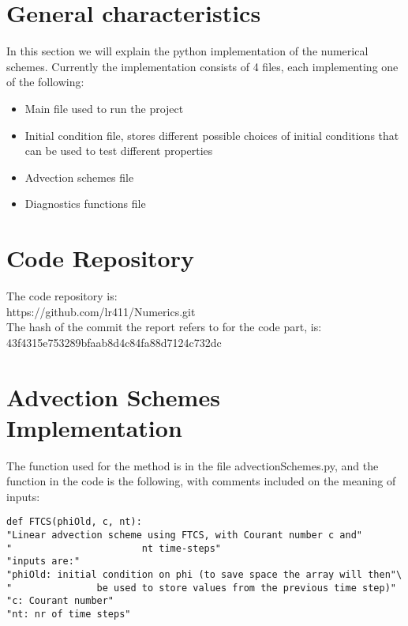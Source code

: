 

\section{General characteristics}
In this section we will explain the python implementation of the numerical schemes. 
Currently the implementation consists of 4 files, each implementing one of the following:
\begin{itemize}
	\item Main file used to run the project
	\item Initial condition file, stores different possible choices of initial conditions that can be used to test different properties
	\item Advection schemes file
	\item Diagnostics functions file
\end{itemize}

\section{Code Repository}
The code repository is:\\
https://github.com/lr411/Numerics.git\\
The hash of the commit the report refers to for the code part, is:\\
43f4315e753289bfaab8d4c84fa88d7124c732dc


\section{Advection Schemes Implementation}
The function used for the method is in the file advectionSchemes.py, and the function in the code is the following, with comments included on the meaning of inputs:
\begin{lstlisting}
def FTCS(phiOld, c, nt):    
"Linear advection scheme using FTCS, with Courant number c and"
"                       nt time-steps"
"inputs are:"
"phiOld: initial condition on phi (to save space the array will then"\
"               be used to store values from the previous time step)"
"c: Courant number"
"nt: nr of time steps"
\end{lstlisting}
